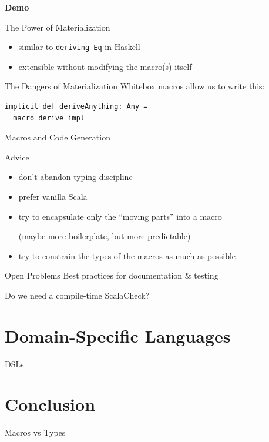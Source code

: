 \documentclass{beamer}
\newcommand\demoslide{
  {
    \setbeamertemplate{background}{}
    \begin{frame}[plain]
      \begin{center}\Large\bfseries Demo\end{center}
    \end{frame}
  }
}
\begin{document}
\demoslide

\begin{frame}{The Power of Materialization}
  \begin{itemize}
    \item similar to \texttt{deriving Eq} in Haskell
    \item extensible without modifying the macro(s) itself
  \end{itemize}
\end{frame}

\begin{frame}[fragile]{The Dangers of Materialization}
  Whitebox macros allow us to write this:
  \vspace{1em}

  \begin{verbatim}
implicit def deriveAnything: Any =
  macro derive_impl
  \end{verbatim}
\end{frame}

\begin{frame}{Macros and Code Generation}
  \begin{block}{Advice}
    \begin{itemize}
      \item don't abandon typing discipline
      \item prefer vanilla Scala
      \item try to encapsulate only the ``moving parts'' into a macro

        (maybe more boilerplate, but more predictable)
      \item try to constrain the types of the macros as much as possible
    \end{itemize}
  \end{block}
  \vspace{1em}

  \begin{block}{Open Problems}
    Best practices for documentation \& testing
    \vspace{1em}

    Do we need a compile-time ScalaCheck?
  \end{block}
\end{frame}

  \section{Domain-Specific Languages}

\begin{frame}{DSLs}
\end{frame}

  \section{Conclusion}

\begin{frame}{Macros vs Types}
\end{frame}
\end{document}
